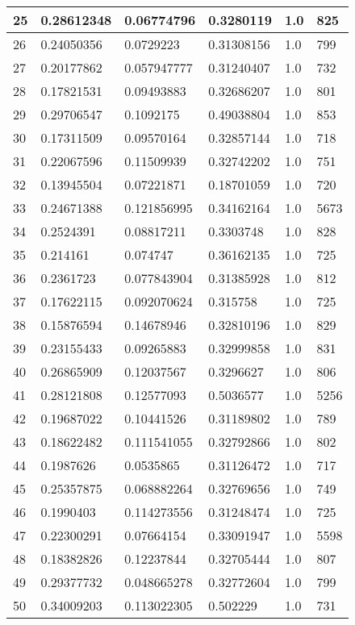 \begin{longtable}{|l|l|l|l|l|l|}
25 & 0.28612348 & 0.06774796 & 0.3280119 & 1.0 & 825 \\ \hline 
26 & 0.24050356 & 0.0729223 & 0.31308156 & 1.0 & 799 \\ \hline 
27 & 0.20177862 & 0.057947777 & 0.31240407 & 1.0 & 732 \\ \hline 
28 & 0.17821531 & 0.09493883 & 0.32686207 & 1.0 & 801 \\ \hline 
29 & 0.29706547 & 0.1092175 & 0.49038804 & 1.0 & 853 \\ \hline 
30 & 0.17311509 & 0.09570164 & 0.32857144 & 1.0 & 718 \\ \hline 
31 & 0.22067596 & 0.11509939 & 0.32742202 & 1.0 & 751 \\ \hline 
32 & 0.13945504 & 0.07221871 & 0.18701059 & 1.0 & 720 \\ \hline 
33 & 0.24671388 & 0.121856995 & 0.34162164 & 1.0 & 5673 \\ \hline 
34 & 0.2524391 & 0.08817211 & 0.3303748 & 1.0 & 828 \\ \hline 
35 & 0.214161 & 0.074747 & 0.36162135 & 1.0 & 725 \\ \hline 
36 & 0.2361723 & 0.077843904 & 0.31385928 & 1.0 & 812 \\ \hline 
37 & 0.17622115 & 0.092070624 & 0.315758 & 1.0 & 725 \\ \hline 
38 & 0.15876594 & 0.14678946 & 0.32810196 & 1.0 & 829 \\ \hline 
39 & 0.23155433 & 0.09265883 & 0.32999858 & 1.0 & 831 \\ \hline 
40 & 0.26865909 & 0.12037567 & 0.3296627 & 1.0 & 806 \\ \hline 
41 & 0.28121808 & 0.12577093 & 0.5036577 & 1.0 & 5256 \\ \hline 
42 & 0.19687022 & 0.10441526 & 0.31189802 & 1.0 & 789 \\ \hline 
43 & 0.18622482 & 0.111541055 & 0.32792866 & 1.0 & 802 \\ \hline 
44 & 0.1987626 & 0.0535865 & 0.31126472 & 1.0 & 717 \\ \hline 
45 & 0.25357875 & 0.068882264 & 0.32769656 & 1.0 & 749 \\ \hline 
46 & 0.1990403 & 0.114273556 & 0.31248474 & 1.0 & 725 \\ \hline 
47 & 0.22300291 & 0.07664154 & 0.33091947 & 1.0 & 5598 \\ \hline 
48 & 0.18382826 & 0.12237844 & 0.32705444 & 1.0 & 807 \\ \hline 
49 & 0.29377732 & 0.048665278 & 0.32772604 & 1.0 & 799 \\ \hline 
50 & 0.34009203 & 0.113022305 & 0.502229 & 1.0 & 731 \\ \hline 
\end{longtable}